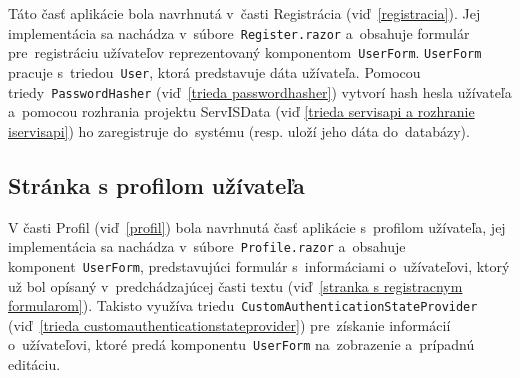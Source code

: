 Táto časť aplikácie bola navrhnutá v~časti Registrácia (viď~\ref{registracia}). Jej implementácia sa nachádza v~súbore~\verb|Register.razor| a~obsahuje formulár pre~registráciu užívateľov reprezentovaný komponentom~\verb|UserForm|. \verb|UserForm| pracuje s~triedou~\verb|User|, ktorá predstavuje dáta užívateľa. Pomocou triedy~\verb|PasswordHasher| (viď~\ref{trieda passwordhasher}) vytvorí hash hesla užívateľa a~pomocou rozhrania projektu ServISData (viď \ref{trieda servisapi a rozhranie iservisapi}) ho zaregistruje do~systému (resp. uloží jeho dáta do~databázy).

\subsection{Stránka s profilom užívateľa}

V časti Profil (viď~\ref{profil}) bola navrhnutá časť aplikácie s~profilom užívateľa, jej implementácia sa nachádza v~súbore~\verb|Profile.razor| a~obsahuje komponent~\verb|UserForm|, predstavujúci formulár s~informáciami o~užívateľovi, ktorý už bol opísaný v~predchádzajúcej časti textu (viď~\ref{stranka s registracnym formularom}). Takisto využíva triedu~\verb|CustomAuthenticationStateProvider| (viď~\ref{trieda customauthenticationstateprovider}) pre~získanie informácií o~užívateľovi, ktoré predá komponentu~\verb|UserForm| na~zobrazenie a~prípadnú editáciu.
